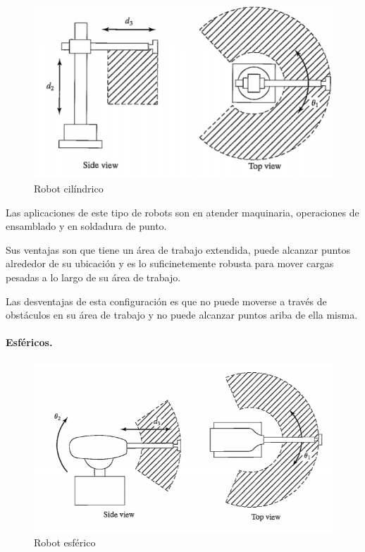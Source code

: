 \begin{figure}
    \centering
    \includegraphics[scale=0.8]{./img/chapter2/cilindrico.png}
    \caption{Robot cilíndrico}
    \label{fig:robotcilindrico}
\end{figure}

Las aplicaciones de este tipo de robots son en atender maquinaria, operaciones de ensamblado y en soldadura de punto.

Sus ventajas son que tiene un área de trabajo extendida, puede alcanzar puntos alrededor de su ubicación y es lo suficinetemente robusta para mover cargas pesadas a lo largo de su área de trabajo. 

Las desventajas de esta configuración es que no puede moverse a través de obstáculos en su área de trabajo y no puede alcanzar puntos ariba de ella misma. 

\paragraph{Esféricos.} 

\begin{figure}
    \centering
    \includegraphics[scale=0.8]{./img/chapter2/esferico.png}
    \caption{Robot esférico}
    \label{fig:robotesferico}
\end{figure}

